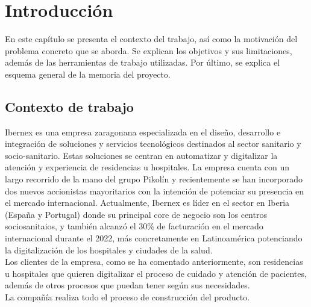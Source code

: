 \chapter{Introducción}
\label{ch:no_lineal}

En este capítulo se presenta el contexto del trabajo, así como la motivación del problema concreto que se aborda. Se explican los objetivos y sus limitaciones, además de las herramientas de trabajo utilizadas. Por último, se explica el esquema general de la memoria del proyecto.

\section{Contexto de trabajo}


 Ibernex \cite{ibernex} es una empresa zaragonana especializada en el diseño, desarrollo e integración de soluciones y servicios tecnológicos destinados al sector sanitario y socio-sanitario. Estas soluciones se centran en automatizar y digitalizar la atención y experiencia de residencias u hospitales. La empresa cuenta con un largo recorrido de la mano del grupo Pikolín y recientemente se han incorporado dos nuevos accionistas mayoritarios con la intención de potenciar su presencia en el mercado internacional. Actualmente, Ibernex es líder en el sector en Iberia (España y Portugal) donde su principal core de negocio son los centros sociosanitaios, y también alcanzó el 30\% de facturación en el mercado internacional durante el 2022, más concretamente en Latinoamérica potenciando la digitalización de los hospitales y ciudades de la salud. \\

 Los clientes de la empresa, como se ha comentado anteriormente, son residencias u hospitales que quieren digitalizar el proceso de cuidado y atención de pacientes, además de otros procesos que puedan tener según sus necesidades. \\



La compañía realiza todo el proceso de construcción del producto. \\

